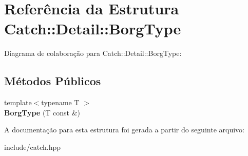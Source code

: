 \hypertarget{structCatch_1_1Detail_1_1BorgType}{}\section{Referência da Estrutura Catch\+:\+:Detail\+:\+:Borg\+Type}
\label{structCatch_1_1Detail_1_1BorgType}


Diagrama de colaboração para Catch\+:\+:Detail\+:\+:Borg\+Type\+:
\subsection*{Métodos Públicos}
\begin{DoxyCompactItemize}
\item 
{\footnotesize template$<$typename T $>$ }\\{\bfseries Borg\+Type} (T const \&)\hypertarget{structCatch_1_1Detail_1_1BorgType_a780a9946ed0d654f0bfc043c8fc505d8}{}\label{structCatch_1_1Detail_1_1BorgType_a780a9946ed0d654f0bfc043c8fc505d8}

\end{DoxyCompactItemize}


A documentação para esta estrutura foi gerada a partir do seguinte arquivo\+:\begin{DoxyCompactItemize}
\item 
include/catch.\+hpp\end{DoxyCompactItemize}
